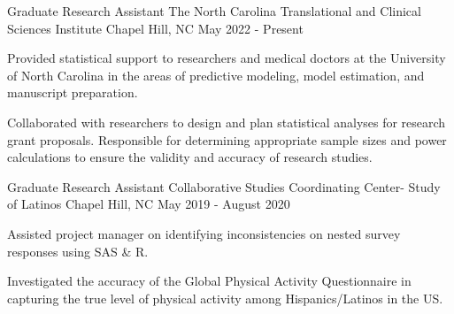 

\begin{cventries}

  \cventry
    {Graduate Research Assistant} %
    {The North Carolina Translational and Clinical Sciences Institute} %
    {Chapel Hill, NC} %
    {May 2022 - Present} %
    {
      \begin{cvitems} %
        \item Provided statistical support to researchers and medical doctors at the University of North Carolina in the areas of \newline predictive modeling, model estimation, and manuscript preparation. 
        \item Collaborated with researchers to design and plan statistical analyses for research grant proposals. Responsible for determining \newline appropriate sample sizes and power calculations to ensure the validity and accuracy of research studies.
      \end{cvitems}
    }
    
\cventry
{Graduate Research Assistant} %
{Collaborative Studies Coordinating Center- Study of Latinos} %
{Chapel Hill, NC} %
{May 2019 - August 2020} %
{
  \begin{cvitems} %
\item Assisted project manager on identifying inconsistencies on nested survey responses using SAS \& R.
\item Investigated the accuracy of the Global Physical Activity Questionnaire in capturing the true level of physical activity \newline among Hispanics/Latinos in the US.
  \end{cvitems}
}

\end{cventries}

